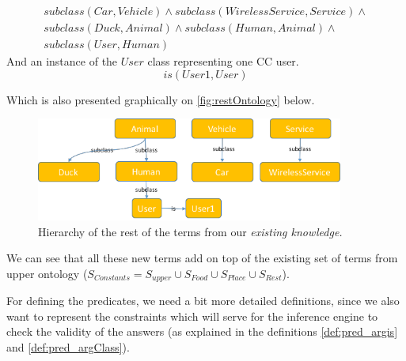 \begin{equation}\label{as:kbPlaceSubclasses}
\begin{gathered}
    subclass(Car,Vehicle) \land subclass(WirelessService,Service)\land\\
	subclass(Duck,Animal)\land subclass(Human,Animal)\land \\
	subclass(User,Human)
\end{gathered}
\end{equation}
And an instance of the $User$ class representing one CC user.
\begin{equation}\label{as:user1}
	is(User1,User)
\end{equation}

Which is also presented graphically on \autoref{fig:restOntology} below.
\begin{figure}[H]
	\centering
		\includegraphics[width=0.9\textwidth]{figures/restOntology.png}
	\caption{Hierarchy of the rest of the terms from our \emph{existing 
	knowledge.}}
	\label{fig:restOntology}
\end{figure}
We can see that all these new terms add on top of the existing set of terms from 
upper ontology ($S_{Constants} = S_{upper} \cup S_{Food} \cup S_{Place} 
\cup S_{Rest}$). 

For defining the predicates, we need a bit more detailed definitions, since we 
also want to represent the constraints which will serve for the inference 
engine to check the validity of the answers (as explained in the definitions
\ref{def:pred_argis} and \ref{def:pred_argClass}).

